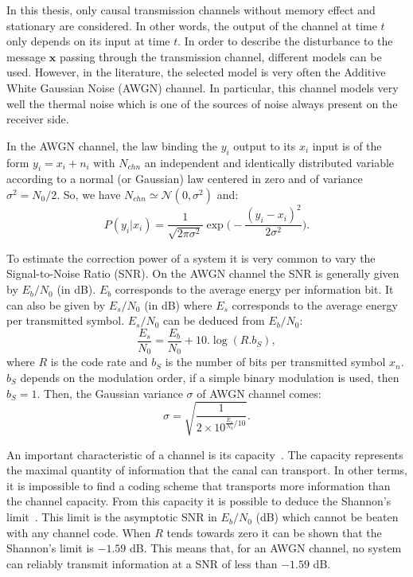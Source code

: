 In this thesis, only causal transmission channels without memory effect and
stationary are considered. In other words, the output of the channel at time $t$
only depends on its input at time $t$. In order to describe the disturbance to
the message $\bm{x}$ passing through the transmission channel, different
models can be used. However, in the literature, the selected model is very
often the Additive White Gaussian Noise (AWGN) channel. In particular, this
channel models very well the thermal noise which is one of the sources of
noise always present on the receiver side.

In the AWGN channel, the law binding the $y_i$ output to its $x_i$ input is of
the form $y_i = x_i + n_i$ with $N_{chn}$ an independent and identically
distributed variable according to a normal (or Gaussian) law centered in zero
and of variance $\sigma^2 = N_0 / 2$. So, we have $N_{chn} \simeq \mathcal{N}(0,
\sigma^2)$ and:
\begin{equation}
P(y_i|x_i) = \frac{1}{\sqrt{2\pi\sigma^2}}\exp{\Big(-\frac{(y_i-x_i)^2}{2\sigma^2}\Big)}.
\end{equation}

To estimate the correction power of a system it is very common to vary the
Signal-to-Noise Ratio (SNR). On the AWGN channel the SNR is generally given by
$E_b/N_0$ (in dB). $E_b$ corresponds to the average energy per information bit.
It can also be given by $E_s/N_0$ (in dB) where $E_s$ corresponds to the average
energy per transmitted symbol. $E_s/N_0$ can be deduced from $E_b/N_0$:
\begin{equation}
\frac{E_s}{N_0} = \frac{E_b}{N_0} + 10.\log{(R.b_S)},
\end{equation}
where $R$ is the code rate and $b_S$ is the number of bits per transmitted
symbol $x_n$. $b_S$ depends on the modulation order, if a simple binary modulation
is used, then $b_S = 1$. Then, the Gaussian variance $\sigma$ of AWGN channel
comes:
\begin{equation}
\sigma = \sqrt{\frac{1}{2 \times 10^{\frac{E_s}{N_0} / 10}}}.
\end{equation}

An important characteristic of a channel is its capacity~\cite{Ryan2009}. The
capacity represents the maximal quantity of information that the canal can
transport. In other terms, it is impossible to find a coding scheme that
transports more information than the channel capacity.
From this capacity it is possible to deduce the Shannon's
limit~\cite{Shannon1948}. This limit is the asymptotic SNR in $E_b/N_0$ (dB)
which cannot be beaten with any channel code. When $R$ tends towards zero it can
be shown that the Shannon's limit is $-1.59$ dB. This means that, for an AWGN
channel, no system can reliably transmit information at a SNR of less than
$-1.59$ dB.

